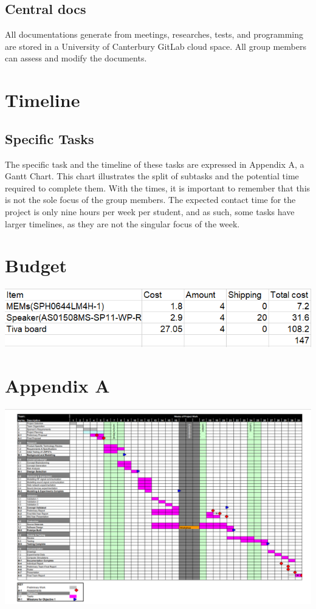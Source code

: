 \documentclass[9pt, a4paper]{report}
\begin{document}
		\subsection*{Central docs}
			All documentations generate from meetings, researches, tests, and programming are stored in a University of Canterbury GitLab cloud space.  All group members can assess and modify the documents. 
	
	\section*{Timeline}
	
	\subsection*{Specific Tasks}
	The specific task and the timeline of these tasks are expressed in Appendix A, a Gantt Chart. This chart illustrates the split of subtasks and the potential time required to complete them. With the times, it is important to remember that this is not the sole focus of the group members. The expected contact time for the project is only nine hours per week per student, and as such, some tasks have larger timelines, as they are not the singular focus of the week.\\
	
	
	\section*{Budget}
	\noindent
	\includegraphics[width=\textwidth]{./Figures/Budget}
	
	\pagebreak

	
	\section*{Appendix A}
		\noindent
		\begin{minipage}{\textwidth}
	    \centering
		\includegraphics[angle = 90, width=\hsize]{./Figures/Gnatt}
	\end{minipage}
\end{document}
